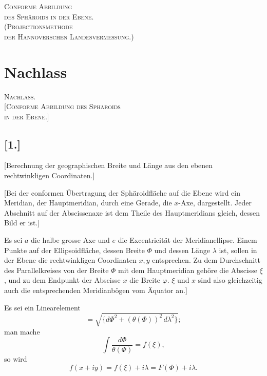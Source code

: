 \documentclass[12pt,a4paper]{article}
\begin{document}
\begin{center}
{\Large\textsc{Conforme Abbildung}}\\[4pt]
{\Large\textsc{des Sphäroids in der Ebene.}}\\[8pt]
\textsc{(Projectionsmethode}\\
\textsc{der Hannoverschen Landesvermessung.)}
\end{center}

\vfill
\newpage

\thispagestyle{empty}
\vfill
\newpage

\section*{Nachlass}

\begin{center}
{\large\textsc{Nachlass.}}\\[12pt]
\textsc{[Conforme Abbildung des Sphäroids\\in der Ebene.]}
\end{center}

\vspace{1em}

\subsection*{[1.]}
\begin{center}
[Berechnung der geographischen Breite und Länge aus den ebenen\\rechtwinkligen Coordinaten.]
\end{center}

[Bei der conformen Übertragung der Sphäroidfläche auf die Ebene wird ein Meridian, der Hauptmeridian, durch eine Gerade, die $x$-Axe, dargestellt. Jeder Abschnitt auf der Abscissenaxe ist dem Theile des Hauptmeridians gleich, dessen Bild er ist.]

Es sei $a$ die halbe grosse Axe und $e$ die Excentricität der Meridianellipse. Einem Punkte auf der Ellipsoidfläche, dessen Breite $\Phi$ und dessen Länge $\lambda$ ist, sollen in der Ebene die rechtwinkligen Coordinaten $x,y$ entsprechen. Zu dem Durchschnitt des Parallelkreises von der Breite $\Phi$ mit dem Hauptmeridian gehöre die Abscisse $\xi$, und zu dem Endpunkt der Abscisse $x$ die Breite $\varphi$. $\xi$ und $x$ sind also gleichzeitig auch die entsprechenden Meridianbögen vom Äquator an.]

Es sei ein Linearelement
\[
= \sqrt{\{d\Phi^2 + (\theta(\Phi))^2\,d\lambda^2\}};
\]
man mache
\[
\int\frac{d\Phi}{\theta(\Phi)} = f(\xi),
\]
so wird
\[
f(x+iy) = f(\xi) + i\lambda = F(\Phi) + i\lambda.
\]
\end{document}
